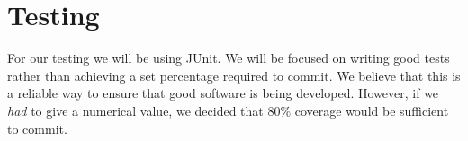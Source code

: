 \section{Testing}

For our testing we will be using JUnit. We will be focused on writing good tests rather than achieving a set percentage required to commit. We believe that this is a reliable way to ensure that good software is being developed. However, if we \textit{had} to give a numerical value, we decided that 80\% coverage would be sufficient to commit.


